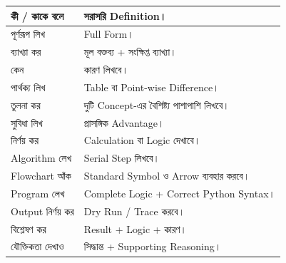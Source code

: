 \begin{longtable}{
|L{0.30\textwidth}
|L{0.62\textwidth}|
}

\endfirsthead

\endhead

কী / কাকে বলে
&
সরাসরি Definition।
\\
\hline

পূর্ণরূপ লিখ
&
Full Form।
\\
\hline

ব্যাখ্যা কর
&
মূল বক্তব্য + সংক্ষিপ্ত ব্যাখ্যা।
\\
\hline

কেন
&
কারণ লিখবে।
\\
\hline

পার্থক্য লিখ
&
Table বা Point-wise Difference।
\\
\hline

তুলনা কর
&
দুটি Concept-এর বৈশিষ্ট্য পাশাপাশি লিখবে।
\\
\hline

সুবিধা লিখ
&
প্রাসঙ্গিক Advantage।
\\
\hline

নির্ণয় কর
&
Calculation বা Logic দেখাবে।
\\
\hline

Algorithm লেখ
&
Serial Step লিখবে।
\\
\hline

Flowchart আঁক
&
Standard Symbol ও Arrow ব্যবহার করবে।
\\
\hline

Program লেখ
&
Complete Logic + Correct Python Syntax।
\\
\hline

Output নির্ণয় কর
&
Dry Run / Trace করবে।
\\
\hline

বিশ্লেষণ কর
&
Result + Logic + কারণ।
\\
\hline

যৌক্তিকতা দেখাও
&
সিদ্ধান্ত + Supporting Reasoning।
\\
\hline

\end{longtable}


